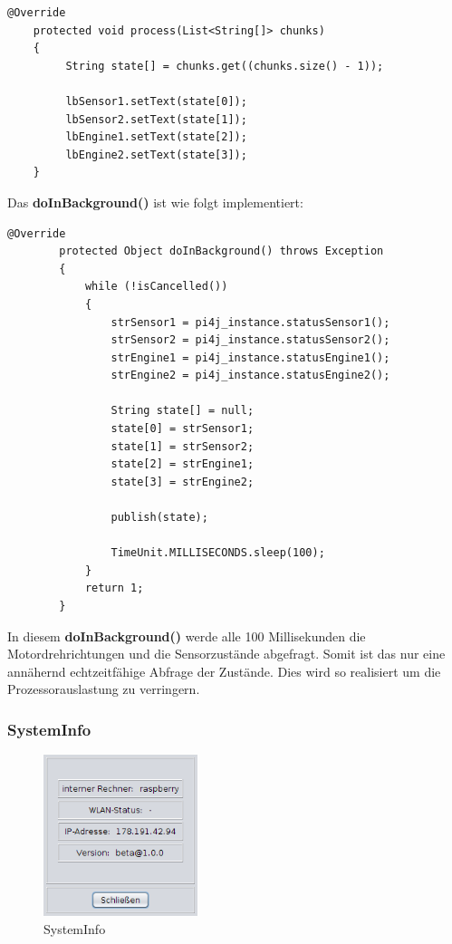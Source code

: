 \begin{lstlisting}[style=JavaStyle, caption= Label aktualisieren]
	@Override
    protected void process(List<String[]> chunks)
    {
         String state[] = chunks.get((chunks.size() - 1));
            
         lbSensor1.setText(state[0]);
         lbSensor2.setText(state[1]);
         lbEngine1.setText(state[2]);
         lbEngine2.setText(state[3]);
    } 
\end{lstlisting}
Das \textbf{doInBackground()} ist wie folgt implementiert:
\begin{lstlisting}[style=JavaStyle, caption= Motor- und Sensorzustände, label=SwingWorker_MotorSensorStatus]
	@Override
        protected Object doInBackground() throws Exception
        {                        
            while (!isCancelled())
            {
                strSensor1 = pi4j_instance.statusSensor1();
                strSensor2 = pi4j_instance.statusSensor2();
                strEngine1 = pi4j_instance.statusEngine1();
                strEngine2 = pi4j_instance.statusEngine2();
                
                String state[] = null;
                state[0] = strSensor1;
                state[1] = strSensor2;
                state[2] = strEngine1;
                state[3] = strEngine2;
                
                publish(state);
                
                TimeUnit.MILLISECONDS.sleep(100);
            } 
            return 1;            
        }

\end{lstlisting}
In diesem \textbf{doInBackground()} werde  alle 100 Millisekunden die Motordrehrichtungen und die Sensorzustände abgefragt. Somit ist das nur eine annähernd echtzeitfähige Abfrage der Zustände. Dies wird so realisiert um die Prozessorauslastung zu verringern.

\newpage

\subsubsection{SystemInfo}
\begin{figure}
\vspace{-20pt}
  \begin{center}
    \includegraphics[width=0.40\textwidth]{Bilder/GUI/SystemInfo}
  \end{center}
  \caption{SystemInfo}
  \label{SystemInfo}
  \vspace{-60pt}
\end{figure}
   

